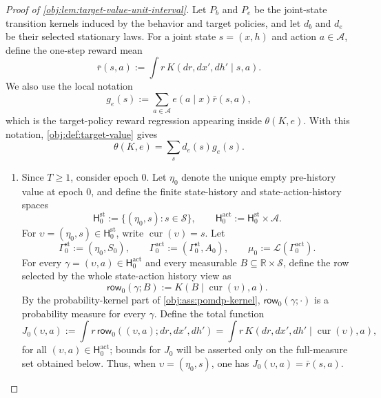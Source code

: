 \documentclass[11pt]{article}
\begin{document}
\begin{proof}[Proof of \cref{obj:lem:target-value-unit-interval}]
Let \(P_b\) and \(P_e\) be the joint-state transition kernels induced by the behavior and target policies, and let \(d_b\) and \(d_e\) be their selected stationary laws. For a joint state \(s=(x,h)\) and action \(a\in\mathcal A\), define the one-step reward mean
\[
\bar r(s,a)
:=
\int r\,K(d r,d x',d h'\mid s,a).
\]
We also use the local notation
\[
g_e(s)
:=
\sum_{a\in\mathcal A} e(a\mid x)\bar r(s,a),
\]
which is the target-policy reward regression appearing inside \(\theta(K,e)\). With this notation, \cref{obj:def:target-value} gives
\[
\theta(K,e)=\sum_s d_e(s)g_e(s).
\]

\begin{enumerate}
\item Since \(T\ge1\), consider epoch \(0\). Let \(\eta_0\) denote the unique empty pre-history value at epoch \(0\), and define the finite state-history and state-action-history spaces
\[
\mathsf H^{\mathrm{st}}_0
:=
\{(\eta_0,s):s\in\mathcal S\},
\qquad
\mathsf H^{\mathrm{act}}_0
:=
\mathsf H^{\mathrm{st}}_0\times\mathcal A.
\]
For \(\upsilon=(\eta_0,s)\in\mathsf H^{\mathrm{st}}_0\), write \(\operatorname{cur}(\upsilon)=s\). Let
\[
\Gamma^{\mathrm{st}}_0:=(\eta_0,S_0),
\qquad
\Gamma^{\mathrm{act}}_0:=(\Gamma^{\mathrm{st}}_0,A_0),
\qquad
\mu_0:=\mathcal L(\Gamma^{\mathrm{act}}_0).
\]
For every \(\gamma=(\upsilon,a)\in\mathsf H^{\mathrm{act}}_0\) and every measurable \(B\subseteq\mathbb R\times\mathcal S\), define the row selected by the whole state-action history view as
\[
\mathsf{row}_0(\gamma;B)
:=
K(B\mid \operatorname{cur}(\upsilon),a).
\]
By the probability-kernel part of \cref{obj:ass:pomdp-kernel}, \(\mathsf{row}_0(\gamma;\cdot)\) is a probability measure for every \(\gamma\). Define the total function
\[
J_0(\upsilon,a)
:=
\int r\,\mathsf{row}_0((\upsilon,a);d r,d x',d h')
=
\int r\,K(d r,d x',d h'\mid \operatorname{cur}(\upsilon),a),
\]
for all \((\upsilon,a)\in\mathsf H^{\mathrm{act}}_0\); bounds for \(J_0\) will be asserted only on the full-measure set obtained below. Thus, when \(\upsilon=(\eta_0,s)\), one has \(J_0(\upsilon,a)=\bar r(s,a)\).


\end{enumerate}
\end{proof}
\end{document}
